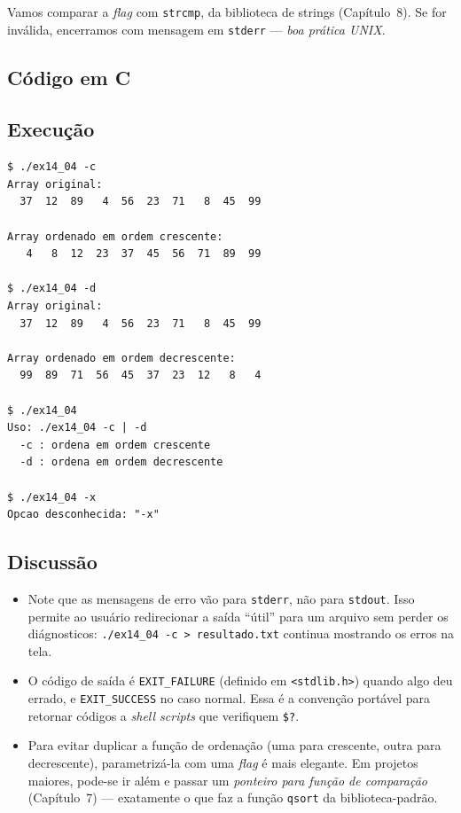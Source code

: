 \documentclass[11pt,a4paper]{article}
\begin{document}
Vamos comparar a \emph{flag} com \texttt{strcmp}, da biblioteca de strings (Cap\'itulo~8). Se for inv\'alida, encerramos com mensagem em \texttt{stderr} --- \emph{boa prática UNIX}.

\subsection*{C\'odigo em C}



\subsection*{Execu\c{c}\~ao}

\begin{saidabox}
\begin{lstlisting}[style=terminal]
$ ./ex14_04 -c
Array original:
  37  12  89   4  56  23  71   8  45  99

Array ordenado em ordem crescente:
   4   8  12  23  37  45  56  71  89  99

$ ./ex14_04 -d
Array original:
  37  12  89   4  56  23  71   8  45  99

Array ordenado em ordem decrescente:
  99  89  71  56  45  37  23  12   8   4

$ ./ex14_04
Uso: ./ex14_04 -c | -d
  -c : ordena em ordem crescente
  -d : ordena em ordem decrescente

$ ./ex14_04 -x
Opcao desconhecida: "-x"
\end{lstlisting}
\end{saidabox}

\subsection*{Discuss\~ao}

\begin{itemize}[leftmargin=*]
  \item Note que as mensagens de erro v\~ao para \texttt{stderr}, n\~ao para \texttt{stdout}. Isso permite ao usu\'ario redirecionar a sa\'ida ``\'util'' para um arquivo sem perder os di\'agnosticos: \texttt{./ex14\_04 -c > resultado.txt} continua mostrando os erros na tela.
  \item O c\'odigo de sa\'ida \'e \texttt{EXIT\_FAILURE} (definido em \texttt{<stdlib.h>}) quando algo deu errado, e \texttt{EXIT\_SUCCESS} no caso normal. Essa \'e a conven\c{c}\~ao port\'avel para retornar c\'odigos a \emph{shell scripts} que verifiquem \texttt{\$?}.
  \item Para evitar duplicar a fun\c{c}\~ao de ordena\c{c}\~ao (uma para crescente, outra para decrescente), parametriz\'a-la com uma \emph{flag} \'e mais elegante. Em projetos maiores, pode-se ir al\'em e passar um \emph{ponteiro para fun\c{c}\~ao de compara\c{c}\~ao} (Cap\'itulo~7) --- exatamente o que faz a fun\c{c}\~ao \texttt{qsort} da biblioteca-padr\~ao.
\end{itemize}
\end{document}
